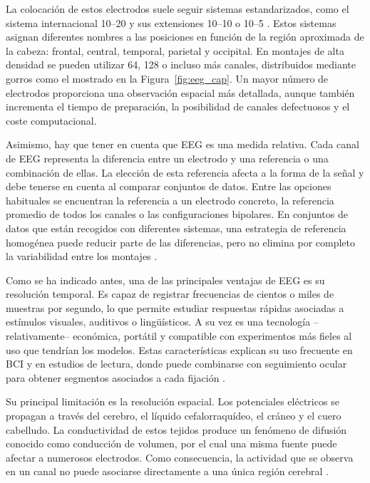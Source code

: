 La colocación de estos electrodos suele seguir sistemas estandarizados, como el sistema internacional 10--20 y sus extensiones 10--10 o 10--5 \cite{jasper1958ten, oostenveld2001five}. Estos sistemas asignan diferentes nombres a las posiciones en función de la región aproximada de la cabeza: frontal, central, temporal, parietal y occipital. En montajes de alta densidad se pueden utilizar 64, 128 o incluso más canales, distribuidos mediante gorros como el mostrado en la Figura~\ref{fig:eeg_cap}. Un mayor número de electrodos proporciona una observación espacial más detallada, aunque también incrementa el tiempo de preparación, la posibilidad de canales defectuosos y el coste computacional.



Asimismo, hay que tener en cuenta que EEG es una medida relativa. Cada canal de EEG representa la diferencia entre un electrodo y una referencia o una combinación de ellas. La elección de esta referencia afecta a la forma de la señal y debe tenerse en cuenta al comparar conjuntos de datos. Entre las opciones habituales se encuentran la referencia a un electrodo concreto, la referencia promedio de todos los canales o las configuraciones bipolares. En conjuntos de datos que están recogidos con diferentes sistemas, una estrategia de referencia homogénea puede reducir parte de las diferencias, pero no elimina por completo la variabilidad entre los montajes \cite{yao2019reference}.

Como se ha indicado antes, una de las principales ventajas de EEG es su resolución temporal. Es capaz de registrar frecuencias de cientos o miles de muestras por segundo, lo que permite estudiar respuestas rápidas asociadas a estímulos visuales, auditivos o lingüísticos. A su vez es una tecnología --relativamente-- económica, portátil y compatible con experimentos más fieles al uso que tendrían los modelos. Estas características explican su uso frecuente en BCI y en estudios de lectura, donde puede combinarse con seguimiento ocular para obtener segmentos asociados a cada fijación \cite{hollenstein2020zuco2}.

Su principal limitación es la resolución espacial. Los potenciales eléctricos se propagan a través del cerebro, el líquido cefalorraquídeo, el cráneo y el cuero cabelludo. La conductividad de estos tejidos produce un fenómeno de difusión conocido como conducción de volumen, por el cual una misma fuente puede afectar a numerosos electrodos. Como consecuencia, la actividad que se observa en un canal no puede asociarse directamente a una única región cerebral \cite{hamalainen1993meg,gross2013meg}.

